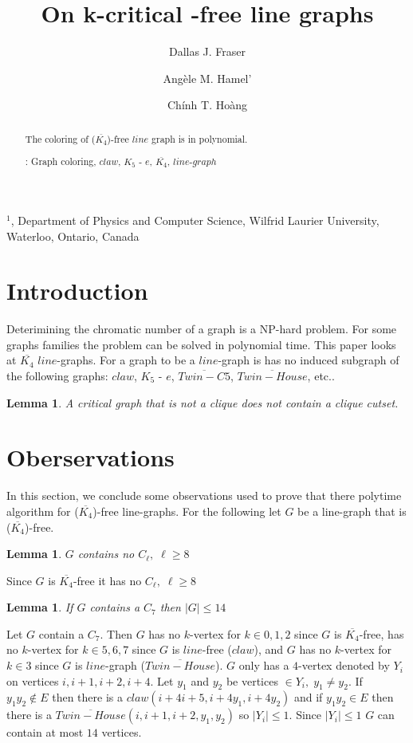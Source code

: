 \documentclass[12pt]{article}
\title{On k-critical {\FAM}-free line graphs}
\author{
	Dallas J. Fraser\inst{1}
	\and Ang\`ele M. Hamel'\inst{1}
	\and Ch\'inh T. Ho\`ang\inst{1}
}
\newtheorem{Lemma}[Theorem]{Lemma}
\def\inst#1{$^{#1}$}
\def\FAM{($\overline{K_4}$)}
\begin{document}
\maketitle

\begin{center}
{\footnotesize

\inst{1}, Department of Physics and Computer Science, Wilfrid Laurier
University, \\Waterloo, Ontario, Canada}

\end{center}

\begin{abstract}
The coloring of {\FAM}-free $line$ graph is in polynomial.

: Graph coloring, $claw$, $K_5$ - $e$, $\overline{K_4}$, $line$-$graph$ 
\end{abstract}


\section{Introduction}\label{sec:intro}
Deterimining the chromatic number of a graph is a NP-hard problem. For some graphs families the problem can be solved in polynomial time. This paper looks at $\overline{K_4}$ $line$-graphs. For a graph to be a $line$-graph is has no induced subgraph of the following graphs: $claw$, $K_5$ - $e$, $\overline{Twin-C5}$, $\overline{Twin-House}$, etc..

\begin{Lemma}\label{lem:cliqueCutset}
A critical graph that is not a clique does not contain a clique
cutset.
\end{Lemma}

\section{Oberservations}\label{sec:observations}
In this section, we conclude some observations used to prove that there polytime algorithm for {\FAM}-free line-graphs. For the following let $G$ be a line-graph that is {\FAM}-free.

\begin{Lemma}\label{lem:cl-free}
$G$ contains no $C_\ell,\; \ell \geq 8$
\end{Lemma}
 Since $G$ is $\overline{K_4}$-free it has no $C_\ell,\; \ell \geq 8$

\begin{Lemma}\label{lem:c7-bounded}
If $G$ contains a $C_7$ then $|G| \leq 14$
\end{Lemma}
 Let $G$ contain a $C_7$. Then $G$ has no $k$-vertex for $k \in {0, 1, 2}$ since $G$ is $\overline{K_4}$-free, has no $k$-vertex for $k \in {5, 6,7}$ since $G$ is $line$-free ($claw$), and $G$ has no $k$-vertex for $k \in {3}$ since $G$ is $line$-graph ($\overline{Twin-House}$). $G$ only has a $4$-vertex denoted by $Y_i$ on vertices $i,i+1,i+2,i+4$. Let $y_1$ and $y_2$ be vertices $\in Y_i,\; y_1 \neq y_2$. If $y_1y_2 \not \in E$ then there is a $claw (i+4i+5,i+4y_1,i+4y_2)$ and if $y_1y_2 \in E$ then there is a $\overline{Twin-House}(i,i+1,i+2,y_1,y_2)$ so $|Y_i| \leq 1$. Since $|Y_i| \leq 1$ $G$ can contain at most $14$ vertices.
\end{document}

